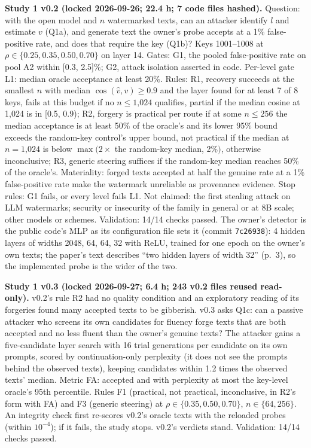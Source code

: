 \documentclass[11pt,letterpaper]{article}
\begin{document}
\textbf{Study 1 v0.2 (locked 2026-09-26; 22.4 h; 7 code files hashed).} Question: with the open model and \(n\) watermarked texts, can an attacker identify \(l\) and estimate \(v\) (Q1a), and generate text the owner's probe accepts at a 1\% false-positive rate, and does that require the key (Q1b)? Keys 1001--1008 at \(\rho \in \{0.25, 0.35, 0.50, 0.70\}\) on layer 14. Gates: G1, the pooled false-positive rate on pool A2 within {[}0.3, 2.5{]}\%; G2, attack isolation asserted in code. Per-level gate L1: median oracle acceptance at least 20\%. Rules: R1, recovery succeeds at the smallest \(n\) with median \(\cos(\hat v, v) \geq 0.9\) and the layer found for at least 7 of 8 keys, fails at this budget if no \(n \leq \text{1,024}\) qualifies, partial if the median cosine at 1,024 is in {[}0.5, 0.9); R2, forgery is practical per route if at some \(n \leq 256\) the median acceptance is at least 50\% of the oracle's and its lower 95\% bound exceeds the random-key control's upper bound, not practical if the median at \(n = \text{1,024}\) is below \(\max(2 \times\) the random-key median, 2\%\()\), otherwise inconclusive; R3, generic steering suffices if the random-key median reaches 50\% of the oracle's. Materiality: forged texts accepted at half the genuine rate at a 1\% false-positive rate make the watermark unreliable as provenance evidence. Stop rules: G1 fails, or every level fails L1. Not claimed: the first stealing attack on LLM watermarks; security or insecurity of the family in general or at 8B scale; other models or schemes. Validation: 14/14 checks passed. The owner's detector is the public code's MLP as its configuration file sets it (commit \texttt{7c26938}): 4 hidden layers of widths 2048, 64, 64, 32 with ReLU, trained for one epoch on the owner's own texts; the paper's text describes ``two hidden layers of width 32'' (p.~3), so the implemented probe is the wider of the two.

\textbf{Study 1 v0.3 (locked 2026-09-27; 6.4 h; 243 v0.2 files reused read-only).} v0.2's rule R2 had no quality condition and an exploratory reading of its forgeries found many accepted texts to be gibberish. v0.3 asks Q1c: can a passive attacker who screens its own candidates for fluency forge texts that are both accepted and no less fluent than the owner's genuine texts? The attacker gains a five-candidate layer search with 16 trial generations per candidate on its own prompts, scored by continuation-only perplexity (it does not see the prompts behind the observed texts), keeping candidates within 1.2 times the observed texts' median. Metric FA: accepted and with perplexity at most the key-level oracle's 95th percentile. Rules F1 (practical, not practical, inconclusive, in R2's form with FA) and F3 (generic steering) at \(\rho \in \{0.35, 0.50, 0.70\}\), \(n \in \{64, 256\}\). An integrity check first re-scores v0.2's oracle texts with the reloaded probes (within \(10^{-4}\)); if it fails, the study stops. v0.2's verdicts stand. Validation: 14/14 checks passed.
\end{document}
